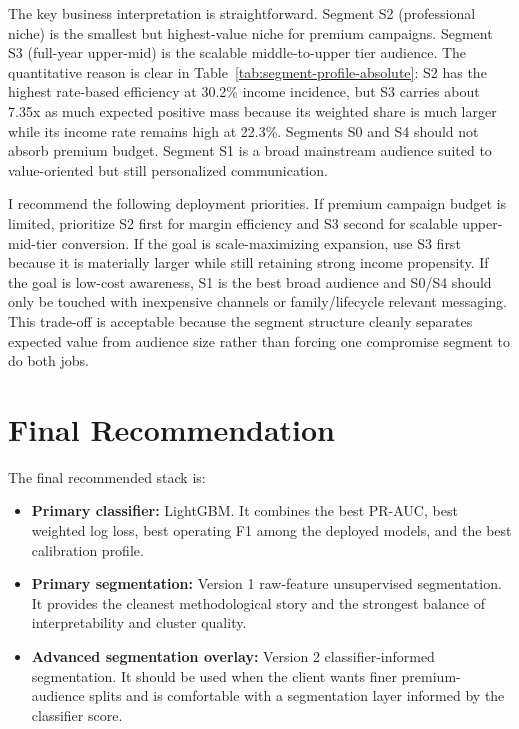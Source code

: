 \documentclass[12pt]{article}
\begin{document}
The key business interpretation is straightforward. Segment S2 (professional
niche) is the smallest but highest-value niche for premium campaigns. Segment S3
(full-year upper-mid) is the scalable middle-to-upper tier audience. The
quantitative reason is clear in Table~\ref{tab:segment-profile-absolute}: S2 has
the highest rate-based efficiency at 30.2\% income incidence, but S3 carries
about 7.35x as much expected positive mass because its weighted share is much
larger while its income rate remains high at 22.3\%. Segments S0 and S4 should
not absorb premium budget. Segment S1 is a broad mainstream audience suited to
value-oriented but still personalized communication.

I recommend the following deployment priorities. If premium campaign budget is
limited, prioritize S2 first for margin efficiency and S3 second for scalable
upper-mid-tier conversion. If the goal is scale-maximizing expansion, use S3
first because it is materially larger while still retaining strong income
propensity. If the goal is low-cost awareness, S1 is the best broad audience and
S0/S4 should only be touched with inexpensive channels or family/lifecycle
relevant messaging. This trade-off is acceptable because the segment structure
cleanly separates expected value from audience size rather than forcing one
compromise segment to do both jobs.

\section{Final Recommendation}

The final recommended stack is:

\begin{itemize}
\item \textbf{Primary classifier:} LightGBM. It combines the best PR-AUC, best
weighted log loss, best operating F1 among the deployed models, and the best
calibration profile.
\item \textbf{Primary segmentation:} Version 1 raw-feature unsupervised
segmentation. It provides the cleanest methodological story and the strongest
balance of interpretability and cluster quality.
\item \textbf{Advanced segmentation overlay:} Version 2 classifier-informed
segmentation. It should be used when the client wants finer premium-audience
splits and is comfortable with a segmentation layer informed by the classifier
score.
\end{itemize}
\end{document}
